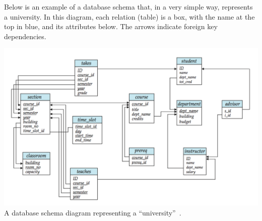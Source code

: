 Below is an example of a database schema that, in a very simple way, represents a university. In this diagram, each relation (table) is a box, with the name at the top in blue, and its attributes below. The arrows indicate foreign key dependencies. 

\begin{center}
	\includegraphics[width=\textwidth]{images/schemadiagram.png}\\
	A database schema diagram representing a ``university''~\cite{dsc}.
\end{center}




